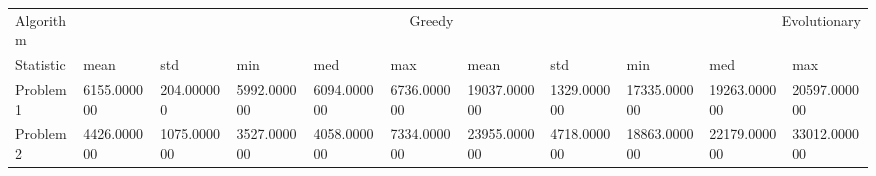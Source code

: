 \begin{tabular}{lllllllllll}
\toprule
Algorithm & \multicolumn{5}{r}{Greedy} & \multicolumn{5}{r}{Evolutionary} \\
Statistic & mean & std & min & med & max & mean & std & min & med & max \\
\midrule
Problem 1 & 6155.000000 & 204.000000 & 5992.000000 & 6094.000000 & 6736.000000 & 19037.000000 & 1329.000000 & 17335.000000 & 19263.000000 & 20597.000000 \\
Problem 2 & 4426.000000 & 1075.000000 & 3527.000000 & 4058.000000 & 7334.000000 & 23955.000000 & 4718.000000 & 18863.000000 & 22179.000000 & 33012.000000 \\
\bottomrule
\end{tabular}
